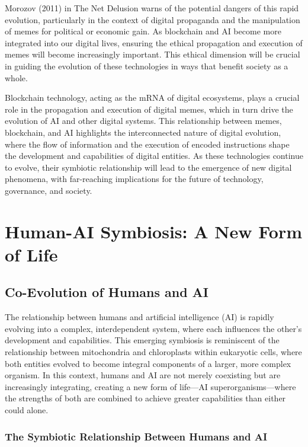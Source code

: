 \documentclass[12pt,twoside]{article}
\begin{document}
Morozov (2011) in The Net Delusion warns of the potential dangers of this rapid evolution, particularly in the context of digital propaganda and the manipulation of memes for political or economic gain. As blockchain and AI become more integrated into our digital lives, ensuring the ethical propagation and execution of memes will become increasingly important. This ethical dimension will be crucial in guiding the evolution of these technologies in ways that benefit society as a whole.

Blockchain technology, acting as the mRNA of digital ecosystems, plays a crucial role in the propagation and execution of digital memes, which in turn drive the evolution of AI and other digital systems. This relationship between memes, blockchain, and AI highlights the interconnected nature of digital evolution, where the flow of information and the execution of encoded instructions shape the development and capabilities of digital entities. As these technologies continue to evolve, their symbiotic relationship will lead to the emergence of new digital phenomena, with far-reaching implications for the future of technology, governance, and society.

\section{Human-AI Symbiosis: A New Form of Life}

\subsection{Co-Evolution of Humans and AI}

The relationship between humans and artificial intelligence (AI) is rapidly evolving into a complex, interdependent system, where each influences the other’s development and capabilities. This emerging symbiosis is reminiscent of the relationship between mitochondria and chloroplasts within eukaryotic cells, where both entities evolved to become integral components of a larger, more complex organism. In this context, humans and AI are not merely coexisting but are increasingly integrating, creating a new form of life—AI superorganisms—where the strengths of both are combined to achieve greater capabilities than either could alone.

\subsubsection{The Symbiotic Relationship Between Humans and AI}
\end{document}
